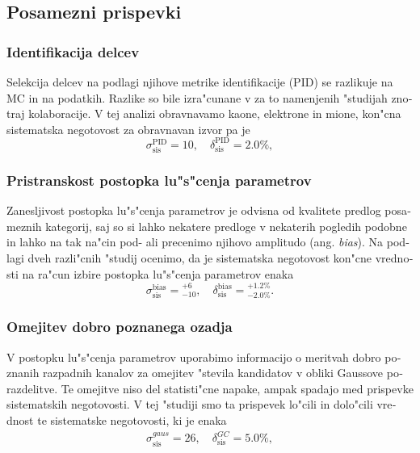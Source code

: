 \begin{otherlanguage}{slovene}
\subsection{Posamezni prispevki}

\subsubsection{Identifikacija delcev}
Selekcija delcev na podlagi njihove metrike identifikacije (PID) se razlikuje na MC in na podatkih. Razlike so bile izra"cunane v za to namenjenih "studijah znotraj kolaboracije. V tej analizi obravnavamo kaone, elektrone in mione, kon"cna sistematska negotovost za obravnavan izvor pa je
\begin{equation}
\sigma_{\mathrm{sis}}^{\mathrm{PID}} = 10,\quad \delta_{\mathrm{sis}}^{\mathrm{PID}} = 2.0\%,
\end{equation}

\subsubsection{Pristranskost postopka lu"s"cenja parametrov}
Zanesljivost postopka lu"s"cenja parametrov je odvisna od kvalitete predlog posameznih kategorij, saj so si lahko nekatere predloge v nekaterih pogledih podobne in lahko na tak na"cin pod- ali precenimo njihovo amplitudo (ang. \textit{bias}). Na podlagi dveh razli"cnih "studij ocenimo, da je sistematska negotovost kon"cne vrednosti na ra"cun izbire postopka lu"s"cenja parametrov enaka
\begin{equation}
\sigma_{\mathrm{sis}}^{\mathrm{bias}} = {}^{+6}_{-10},\quad \delta_{\mathrm{sis}}^{\mathrm{bias}} = {}^{+1.2\%}_{-2.0\%}.
\end{equation}

\subsubsection{Omejitev dobro poznanega ozadja}
V postopku lu"s"cenja parametrov uporabimo informacijo o meritvah dobro poznanih razpadnih kanalov za omejitev "stevila kandidatov v obliki Gaussove porazdelitve. Te omejitve niso del statisti"cne napake, ampak spadajo med prispevke sistematskih negotovosti. V tej "studiji smo ta prispevek lo"cili in dolo"cili vrednost te sistematske negotovosti, ki je enaka
\begin{align}
\sigma_{\mathrm{sis}}^{gaus} = 26,\quad \delta_{\mathrm{sis}}^{GC} = 5.0\%,
\end{align}


\end{otherlanguage}
